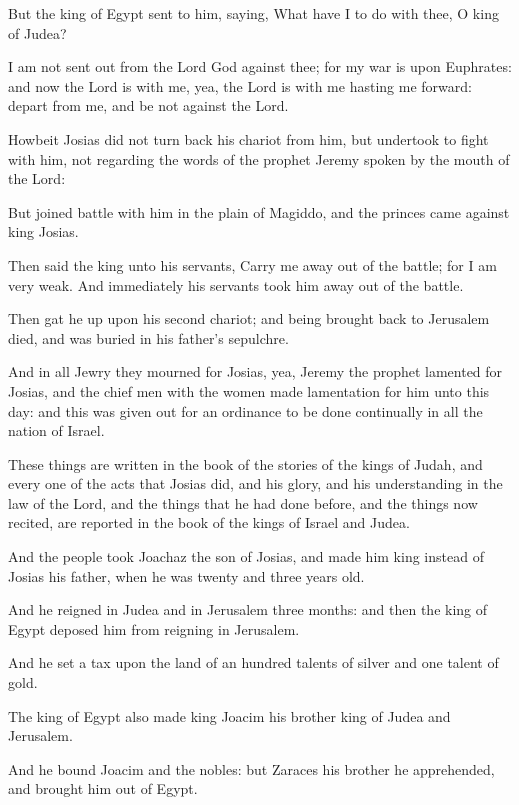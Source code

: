 {\par }{\PP {}But the king of Egypt sent to him, saying, What have I to do with thee, O king of Judea?
\par }{\PP {}I am not sent out from the Lord God against thee; for my war is upon Euphrates: and now the Lord is with me, yea, the Lord is with me hasting me forward: depart from me, and be not against the Lord.
\par }{\PP {}Howbeit Josias did not turn back his chariot from him, but undertook to fight with him, not regarding the words of the prophet Jeremy spoken by the mouth of the Lord:
\par }{\PP {}But joined battle with him in the plain of Magiddo, and the princes came against king Josias.
\par }{\PP {}Then said the king unto his servants, Carry me away out of the battle; for I am very weak. And immediately his servants took him away out of the battle.
\par }{\PP {}Then gat he up upon his second chariot; and being brought back to Jerusalem died, and was buried in his father’s sepulchre.
\par }{\PP {}And in all Jewry they mourned for Josias, yea, Jeremy the prophet lamented for Josias, and the chief men with the women made lamentation for him unto this day: and this was given out for an ordinance to be done continually in all the nation of Israel.
\par }{\PP {}These things are written in the book of the stories of the kings of Judah, and every one of the acts that Josias did, and his glory, and his understanding in the law of the Lord, and the things that he had done before, and the things now recited, are reported in the book of the kings of Israel and Judea.
\par }{\PP {}And the people took Joachaz the son of Josias, and made him king instead of Josias his father, when he was twenty and three years old.
\par }{\PP {}And he reigned in Judea and in Jerusalem three months: and then the king of Egypt deposed him from reigning in Jerusalem.
\par }{\PP {}And he set a tax upon the land of an hundred talents of silver and one talent of gold.
\par }{\PP {}The king of Egypt also made king Joacim his brother king of Judea and Jerusalem.
\par }{\PP {}And he bound Joacim and the nobles: but Zaraces his brother he apprehended, and brought him out of Egypt.
}
